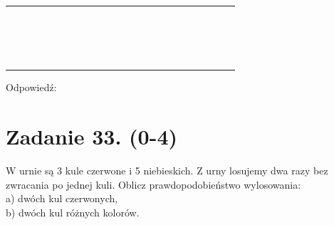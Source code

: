 \documentclass[10pt]{article}
\begin{document}
\begin{center}
\begin{tabular}{|c|c|c|c|c|c|c|c|c|c|c|c|c|c|c|c|c|c|c|c|c|c|c|}
\hline
 &  &  &  &  &  &  &  &  &  &  &  &  &  &  &  &  &  &  &  &  &  &  \\
\hline
 &  &  &  &  &  &  &  &  &  &  &  &  &  &  &  &  &  &  &  &  &  &  \\
\hline
 &  &  &  &  &  &  &  &  &  &  &  &  &  &  &  &  &  &  &  &  &  &  \\
\hline
 &  &  &  &  &  &  &  &  &  &  &  &  &  &  &  &  &  &  &  &  &  &  \\
\hline
 &  &  &  &  &  &  &  &  &  &  &  &  &  &  &  &  &  &  &  &  &  &  \\
\hline
 &  &  &  &  &  &  &  &  &  &  &  &  &  &  &  &  &  &  &  &  &  &  \\
\hline
 &  &  &  &  &  &  &  &  &  &  &  &  &  &  &  &  &  &  &  &  &  &  \\
\hline
 &  &  &  &  &  &  &  &  &  &  &  &  &  &  &  &  &  &  &  &  &  &  \\
\hline
 &  &  &  &  &  &  &  &  &  &  &  &  &  &  &  &  &  &  &  &  &  &  \\
\hline
 &  &  &  &  &  &  &  &  &  &  &  &  &  &  &  &  &  &  &  &  &  &  \\
\hline
 &  &  &  &  &  &  &  &  &  &  &  &  &  &  &  &  &  &  &  &  &  &  \\
\hline
 &  &  &  &  &  &  &  &  &  &  &  &  &  &  &  &  &  &  &  &  &  &  \\
\hline
 &  &  &  &  &  &  &  &  &  &  &  &  &  &  &  &  &  &  &  &  &  &  \\
\hline
 &  &  &  &  &  &  &  &  &  &  &  &  &  &  &  &  &  &  &  &  &  &  \\
\hline
 &  &  &  &  &  &  &  &  &  &  &  &  &  &  &  &  &  &  &  &  &  &  \\
\hline
 &  &  &  &  &  &  &  &  &  &  &  &  &  &  &  &  &  &  &  &  &  &  \\
\hline
 &  &  &  &  &  &  &  &  &  &  &  &  &  &  &  &  &  &  &  &  &  &  \\
\hline
 &  &  &  &  &  &  &  &  &  &  &  &  &  &  &  &  &  &  &  &  &  &  \\
\hline
\end{tabular}
\end{center}

Odpowiedź: \(\qquad\)

\section*{Zadanie 33. (0-4)}
W urnie są 3 kule czerwone i 5 niebieskich. Z urny losujemy dwa razy bez zwracania po jednej kuli. Oblicz prawdopodobieństwo wylosowania:\\
a) dwóch kul czerwonych,\\
b) dwóch kul różnych kolorów.
\end{document}
